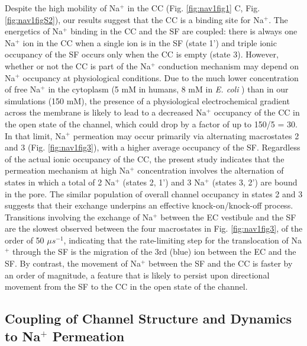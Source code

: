 \begin{refsection}
Despite the high mobility of Na$^+$ in the CC (Fig. \ref{fig:nav1fig1} C, Fig. \ref{fig:nav1figS2}), our results suggest that the CC is a binding site for Na$^+$.  The energetics of Na$^+$ binding in the CC and the SF are coupled: there is always one Na$^+$ ion in the CC when a single ion is in the SF (state 1') and triple ionic occupancy of the SF occurs only when the CC is empty (state 3).  However, whether or not the CC is part of the Na$^+$ conduction mechanism may depend on Na$^+$ occupancy at physiological conditions.  Due to the much lower concentration of free Na$^+$ in the cytoplasm (5 mM in humans, 8 mM in \textit{E. coli} \cite{Maguire:2002wu}) than in our simulations (150 mM), the presence of a physiological electrochemical gradient across the membrane is likely to lead to a decreased Na$^+$ occupancy of the CC in the open state of the channel, which could drop by a factor of up to 150/5 = 30.  In that limit, Na$^+$ permeation may occur primarily via alternating macrostates 2 and 3 (Fig. \ref{fig:nav1fig3}), with a higher average occupancy of the SF. 
Regardless of the actual ionic occupancy of the CC, the present study indicates that the permeation mechanism at high Na$^+$ concentration involves the alternation of states in which a total of 2 Na$^+$ (states 2, 1') and 3 Na$^+$ (states 3, 2') are bound in the pore.  The similar population of overall channel occupancy in states 2 and 3 suggests that their exchange underpins an effective knock-on/knock-off process.  Transitions involving the exchange of Na$^+$ between the EC vestibule and the SF are the slowest observed between the four macrostates in Fig. \ref{fig:nav1fig3}, of the order of 50 $\mu s^{-1}$, indicating that the rate-limiting step for the translocation of Na$^+$ through the SF is the migration of the 3rd (blue) ion between the EC and the SF.  By contrast, the movement of Na$^+$ between the SF and the CC is faster by an order of magnitude, a feature that is likely to persist upon directional movement from the SF to the CC in the open state of the channel.

\subsection{Coupling of Channel Structure and Dynamics to Na$^+$ Permeation}


\end{refsection}
